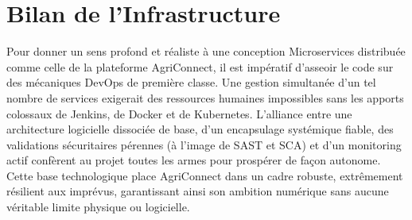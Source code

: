 \documentclass[12pt,a4paper]{article}
\begin{document}
\section{Bilan de l'Infrastructure}

Pour donner un sens profond et réaliste à une conception Microservices distribuée comme celle de la plateforme AgriConnect, il est impératif d'asseoir le code sur des mécaniques DevOps de première classe. Une gestion simultanée d'un tel nombre de services exigerait des ressources humaines impossibles sans les apports colossaux de Jenkins, de Docker et de Kubernetes. L'alliance entre une architecture logicielle dissociée de base, d'un encapsulage systémique fiable, des validations sécuritaires pérennes (à l'image de SAST et SCA) et d'un monitoring actif confèrent au projet toutes les armes pour prospérer de façon autonome. Cette base technologique place AgriConnect dans un cadre robuste, extrêmement résilient aux imprévus, garantissant ainsi son ambition numérique sans aucune véritable limite physique ou logicielle.
\end{document}
